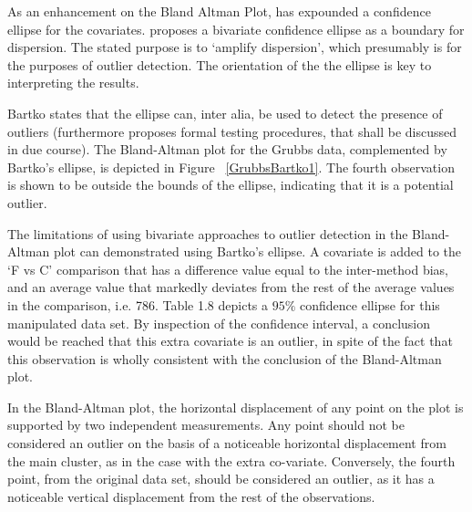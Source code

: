 \documentclass[12pt, a4paper]{report}
\theoremstyle{plain}
\theoremstyle{definition}
\theoremstyle{remark}
\begin{document}
As an enhancement on the Bland Altman Plot, \citet{Bartko} has
expounded a confidence ellipse for the covariates. \citet{Bartko} proposes
a bivariate confidence ellipse as a boundary for dispersion. The stated purpose is to `amplify dispersion', which presumably is for  the purposes of outlier detection. The orientation of the the ellipse is key to interpreting the results.



Bartko states that the ellipse can, inter alia, be used to detect the presence of outliers (furthermore
\citet{Bartko} proposes formal testing procedures, that shall be discussed in due course). 
The Bland-Altman plot for the Grubbs data, complemented by Bartko's ellipse, is depicted in Figure ~\ref{GrubbsBartko1}.
The fourth observation is shown to be outside the bounds of the ellipse, indicating that it is a potential outlier.




The limitations of using bivariate approaches to outlier detection
in the Bland-Altman plot can demonstrated using Bartko's ellipse.
A covariate is added to the `F vs C' comparison that has a
difference value equal to the inter-method bias, and an average
value that markedly deviates from the rest of the average values
in the comparison, i.e. 786. Table 1.8 depicts a $95\%$ confidence
ellipse for this manipulated data set. By inspection of the
confidence interval, a conclusion would be reached that this extra
covariate is an outlier, in spite of the fact that this
observation is wholly consistent with the conclusion of the
Bland-Altman plot.


In the Bland-Altman plot, the horizontal displacement of any point on the plot is supported by two independent measurements. Any point should not be considered an outlier on the basis of a noticeable horizontal displacement from the main cluster, as in the case with the extra co-variate. Conversely, the fourth point, from the original data set, should be considered an
outlier, as it has a noticeable vertical displacement from the rest of the observations.
\end{document}
